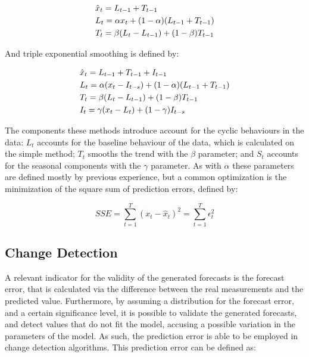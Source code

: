 \begin {equation*}
\centering
\begin {split}
&\hat{x}_t = L_{t-1} + T_{t-1} \\
&L_t = \alpha x_t + (1-\alpha)(L_{t-1} + T_{t-1}) \\
&T_t = \beta (L_t - L_{t-1}) + (1-\beta)T_{t-1}
\end {split}
\label{eq:exp_smooth}
\end {equation*}

\par And triple exponential smoothing is defined by:

\begin {equation*}
\centering
\begin {split}
&\hat{x}_t = L_{t-1} + T_{t-1} + I_{t-1}\\
&L_t = \alpha (x_t - I_{t-s}) + (1-\alpha)(L_{t-1} + T_{t-1}) \\
&T_t = \beta (L_t - L_{t-1}) + (1-\beta)T_{t-1} \\
&I_t = \gamma (x_t - L_t) + (1-\gamma)I_{t-s}
\end {split}
\label{eq:exp_smooth}
\end {equation*}

\par The components these methods introduce account for the cyclic behaviours in the data: $L_t$ accounts for the baseline behaviour of the data, which is calculated on the simple method; $T_t$ smooths the trend with the $\beta$ 
parameter; and $S_t$ accounts for the seasonal components with the $\gamma$ parameter. As with $\alpha$ these parameters are defined mostly by previous experience, but a common optimization is the minimization of the square sum 
of prediction errors, defined by:

\begin {equation*} 
    \label{eq:sse}
    SSE = \sum_{t=1}^T{(x_t-\hat{x}_{t})^2} = \sum_{t=1}^T{\epsilon_t^2}
\end {equation*}

\subsection {Change Detection} \label{subsec:change_detection}

A relevant indicator for the validity of the generated forecasts is the forecast error, that is calculated via the difference between the real measurements and the predicted value. Furthermore, by assuming a distribution for 
the forecast error, and a certain significance level, it is possible to validate the generated forecasts, and detect values that do not fit the model, accusing a possible variation in the parameters of the model. As such,
the prediction error is able to be employed in change detection algorithms. This prediction error can be defined as:

